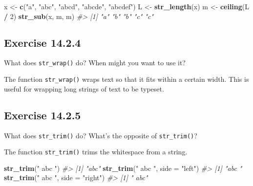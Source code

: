 \documentclass[]{book}
\newenvironment{Shaded}{\begin{snugshade}}{\end{snugshade}}
\newcommand{\CommentTok}[1]{\textcolor[rgb]{0.56,0.35,0.01}{\textit{#1}}}
\newcommand{\DataTypeTok}[1]{\textcolor[rgb]{0.13,0.29,0.53}{#1}}
\newcommand{\DecValTok}[1]{\textcolor[rgb]{0.00,0.00,0.81}{#1}}
\newcommand{\KeywordTok}[1]{\textcolor[rgb]{0.13,0.29,0.53}{\textbf{#1}}}
\newcommand{\NormalTok}[1]{#1}
\newcommand{\OperatorTok}[1]{\textcolor[rgb]{0.81,0.36,0.00}{\textbf{#1}}}
\newcommand{\StringTok}[1]{\textcolor[rgb]{0.31,0.60,0.02}{#1}}
\theoremstyle{plain}
\theoremstyle{remark}
\theoremstyle{definition}
\theoremstyle{definition}
\theoremstyle{definition}
\theoremstyle{remark}
\begin{document}
\begin{Shaded}
\begin{Highlighting}[]
\NormalTok{x <-}\StringTok{ }\KeywordTok{c}\NormalTok{(}\StringTok{"a"}\NormalTok{, }\StringTok{"abc"}\NormalTok{, }\StringTok{"abcd"}\NormalTok{, }\StringTok{"abcde"}\NormalTok{, }\StringTok{"abcdef"}\NormalTok{)}
\NormalTok{L <-}\StringTok{ }\KeywordTok{str_length}\NormalTok{(x)}
\NormalTok{m <-}\StringTok{ }\KeywordTok{ceiling}\NormalTok{(L }\OperatorTok{/}\StringTok{ }\DecValTok{2}\NormalTok{)}
\KeywordTok{str_sub}\NormalTok{(x, m, m)}
\CommentTok{#> [1] "a" "b" "b" "c" "c"}
\end{Highlighting}
\end{Shaded}

\hypertarget{exercise-14.2.4}{%
\subsection*{\texorpdfstring{Exercise
{14.2.4}}{Exercise 14.2.4}}\label{exercise-14.2.4}}

What does \texttt{str\_wrap()} do? When might you want to use it?

The function \texttt{str\_wrap()} wraps text so that it fits within a
certain width. This is useful for wrapping long strings of text to be
typeset.

\hypertarget{exercise-14.2.5}{%
\subsection*{\texorpdfstring{Exercise
{14.2.5}}{Exercise 14.2.5}}\label{exercise-14.2.5}}

What does \texttt{str\_trim()} do? What's the opposite of
\texttt{str\_trim()}?

The function \texttt{str\_trim()} trims the whitespace from a string.

\begin{Shaded}
\begin{Highlighting}[]
\KeywordTok{str_trim}\NormalTok{(}\StringTok{" abc "}\NormalTok{)}
\CommentTok{#> [1] "abc"}
\KeywordTok{str_trim}\NormalTok{(}\StringTok{" abc "}\NormalTok{, }\DataTypeTok{side =} \StringTok{"left"}\NormalTok{)}
\CommentTok{#> [1] "abc "}
\KeywordTok{str_trim}\NormalTok{(}\StringTok{" abc "}\NormalTok{, }\DataTypeTok{side =} \StringTok{"right"}\NormalTok{)}
\CommentTok{#> [1] " abc"}
\end{Highlighting}
\end{Shaded}
\end{document}

